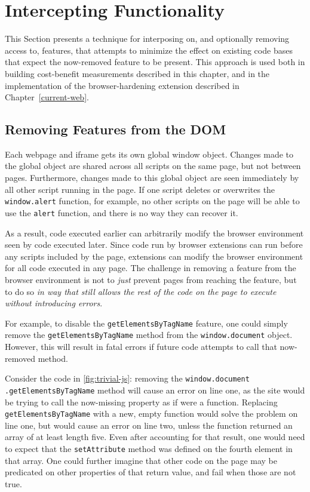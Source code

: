 \section{Intercepting \JS Functionality}
\label{cost-benefit:intercepting-js}

This Section presents a technique for interposing on, and optionally removing
access to, \WAPI features, that attempts to minimize the effect on
existing code bases that expect the now-removed feature to be present.
This approach is used both in building cost-benefit measurements described
in this chapter, and in the implementation of the browser-hardening extension
described in Chapter~\ref{current-web}.


\subsection{Removing Features from the DOM}
\label{cost-benefit:intercepting-js:featremove}
Each webpage and iframe gets its own global
window object.  Changes made to the global object are shared across all scripts
on the same page, but not between pages.  Furthermore, changes made to this
global object are seen immediately by all other script running in the page.  If
one script deletes or overwrites the \texttt{window.alert}
function, for example, no other scripts on the page will be able to use the
\texttt{alert} function, and there is no way they can recover it.

As a result, code executed earlier can arbitrarily modify the browser environment
seen by code executed later.  Since code run by browser extensions can
run before any scripts included by the page, extensions can modify the
browser environment for all code executed in any page.
The challenge in removing a feature from the browser environment is not to
\textit{just} prevent pages from reaching the feature, but to do so \textit{in way that
still allows the rest of the code on the page to execute without introducing errors}.

For example, to disable the \texttt{getElementsByTagName} feature, one could
simply remove the \texttt{getElementsByTagName} method from the
\texttt{window.document} object. However, this will result in fatal errors
if future code attempts to call that now-removed method.

Consider the code in \ref{fig:trivial-js}:  removing the
\texttt{window.document} \texttt{.getElementsByTagName} method will cause an error
on line one, as the site would be trying to call the now-missing property as if
were a function.  Replacing \texttt{getElementsByTagName} with a new, empty
function would solve the problem on line one, but would cause an error on line
two, unless the function returned an array of at least length five. Even after
accounting for that result, one would need to expect that the
\texttt{setAttribute} method was defined on the fourth element in that array.
One could further imagine that other code on the page may be predicated on
other properties of that return value, and fail when those are not true.

